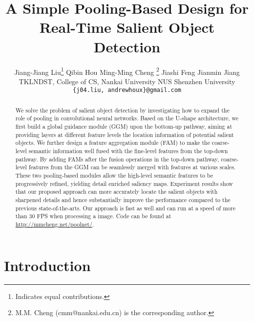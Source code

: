 \documentclass[10pt,twocolumn,letterpaper]{article}
\begin{document}
\title{A Simple Pooling-Based Design for Real-Time Salient Object Detection}

\author{Jiang-Jiang Liu\thanks{Indicates equal contributions.}
  \quad  \quad Qibin Hou\footnotemark[1] \quad \quad 
   Ming-Ming Cheng 
  \thanks{M.M. Cheng (cmm@nankai.edu.cn) is the corresponding author.} \quad \quad
   Jiashi Feng  \quad \quad  Jianmin Jiang\\
   TKLNDST, College of CS, Nankai University \quad \quad
   NUS  \quad \quad Shenzhen University\\
   {\tt\small  \{j04.liu, andrewhoux\}@gmail.com}
}

\maketitle


\begin{abstract}

We solve the problem of salient object 
detection by investigating
how to expand the role of pooling in convolutional neural networks.
Based on the U-shape architecture, we first build a global guidance module (GGM) upon
the bottom-up pathway, aiming at providing layers at different feature levels the 
location information of potential salient objects.
We further design a feature aggregation module (FAM) to
make the coarse-level semantic information well fused with
the fine-level features from the top-down pathway.
By adding FAMs after the fusion operations in the top-down pathway, coarse-level features from
the GGM can be seamlessly merged with features at various scales.
These two pooling-based modules allow the high-level semantic features to
be progressively refined, yielding detail enriched saliency maps.
Experiment results show that our proposed approach
can more accurately locate the salient objects with sharpened details
and hence substantially improve the performance compared to the previous state-of-the-arts.
Our approach is fast as well and can run at a speed of more than 30 FPS 
when processing a  image.
Code can be found at \url{http://mmcheng.net/poolnet/}.

\end{abstract}

\section{Introduction} \label{sec:introduction}
\end{document}
